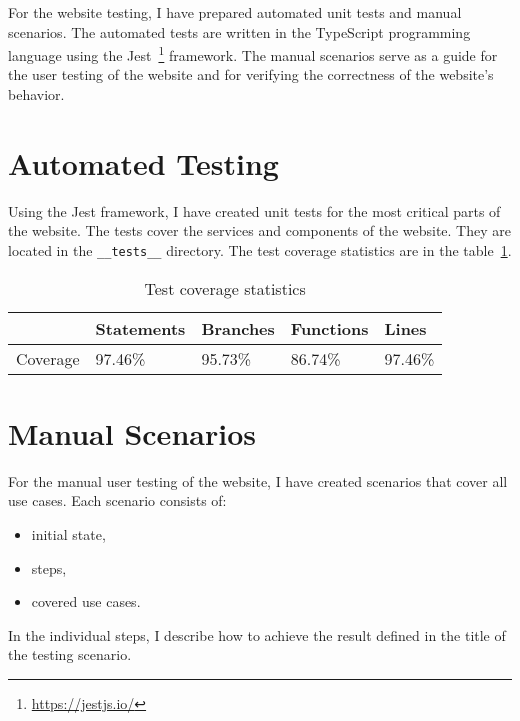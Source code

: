 For the website testing, I have prepared automated unit tests and manual scenarios.
The automated tests are written in the TypeScript programming language using the Jest~\footnote{\url{https://jestjs.io/}} framework.
The manual scenarios serve as a guide for the user testing of the website
and for verifying the correctness of the website's behavior.


\section{Automated Testing}
Using the Jest framework, I have created unit tests for the most critical parts of the website.
The tests cover the services and components of the website.
They are located in the \texttt{\_\_tests\_\_} directory.
The test coverage statistics are in the table~\ref{tab:tests-coverage}.

\begin{table}[hbt!]
    \centering
    \captionsetup{justification=centering}
    \begin{tabular}{|l|l|l|l|l|}
        \hline
        ~        & Statements & Branches & Functions & Lines   \\
        \hline
        Coverage & 97.46\%    & 95.73\%  & 86.74\%   & 97.46\% \\
        \hline
    \end{tabular}
    \caption{Test coverage statistics}
    \label{tab:tests-coverage}
\end{table}


\section{Manual Scenarios}
For the manual user testing of the website, I have created scenarios that cover all use cases.
Each scenario consists of:
\begin{itemize}
    \item initial state,
    \item steps,
    \item covered use cases.
\end{itemize}

In the individual steps, I describe how to achieve the result defined in the title of the testing scenario.

\newcommand{\testing}[1]{%
    \stepcounter{testingcounter}%
    \subsection{T\arabic{testingcounter} -- #1}
}


